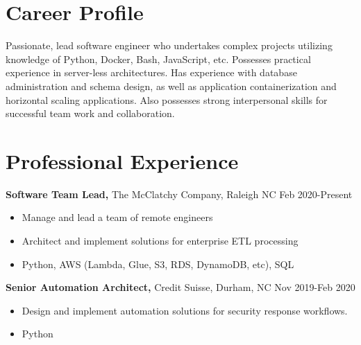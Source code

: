 \documentclass{res}
\begin{document}
 
 
\address{{\bf Present Address} \\ 5973 Dixon Dr. \\ Raleigh, NC 27609  \\
        (336) 681-7224 }
\address{{\bf Permanent Address} \\ 114 East Keeling Rd \\ Greensboro, NC 27410}
 
\begin{resume} 

\noindent\makebox[5.5in]{\rule{6.5in}{0.4pt}}


\section{Career Profile} 
  Passionate, lead software engineer who undertakes complex projects utilizing knowledge of Python, Docker, Bash, JavaScript, etc. Possesses practical experience in server-less architectures. Has experience with database administration and schema design, as well as application containerization and horizontal scaling applications. Also possesses strong interpersonal skills for successful team work and collaboration.
\section{Professional Experience}
  {\bf Software Team Lead,} The McClatchy Company, Raleigh NC \hfill Feb 2020-Present
    \begin{itemize} \itemsep -2pt
      \item Manage and lead a team of remote engineers
      \item Architect and implement solutions for enterprise ETL processing
      \item Python, AWS (Lambda, Glue, S3, RDS, DynamoDB, etc), SQL
    \end{itemize}

  {\bf Senior Automation Architect,} Credit Suisse, Durham, NC \hfill Nov 2019-Feb 2020
    \begin{itemize} \itemsep -2pt
      \item Design and implement automation solutions for security response workflows.
      \item Python
    \end{itemize}


\end{resume}
\end{document}
